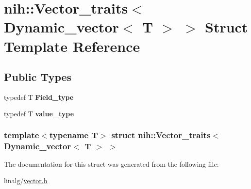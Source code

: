 \hypertarget{structnih_1_1_vector__traits_3_01_dynamic__vector_3_01_t_01_4_01_4}{
\section{nih\-:\-:\-Vector\-\_\-traits$<$ \-Dynamic\-\_\-vector$<$ \-T $>$ $>$ \-Struct \-Template \-Reference}
\label{structnih_1_1_vector__traits_3_01_dynamic__vector_3_01_t_01_4_01_4}
}
\subsection*{\-Public \-Types}
\begin{DoxyCompactItemize}
\item 
\hypertarget{structnih_1_1_vector__traits_3_01_dynamic__vector_3_01_t_01_4_01_4_a6752c55865e9e75cd5e1224f452ec59f}{
typedef \-T {\bfseries \-Field\-\_\-type}}
\label{structnih_1_1_vector__traits_3_01_dynamic__vector_3_01_t_01_4_01_4_a6752c55865e9e75cd5e1224f452ec59f}

\item 
\hypertarget{structnih_1_1_vector__traits_3_01_dynamic__vector_3_01_t_01_4_01_4_a05106651853193c1a6ea611214685d01}{
typedef \-T {\bfseries value\-\_\-type}}
\label{structnih_1_1_vector__traits_3_01_dynamic__vector_3_01_t_01_4_01_4_a05106651853193c1a6ea611214685d01}

\end{DoxyCompactItemize}
\subsubsection*{template$<$typename T$>$ struct nih\-::\-Vector\-\_\-traits$<$ Dynamic\-\_\-vector$<$ T $>$ $>$}



\-The documentation for this struct was generated from the following file\-:\begin{DoxyCompactItemize}
\item 
linalg/\hyperlink{vector_8h}{vector.\-h}\end{DoxyCompactItemize}
